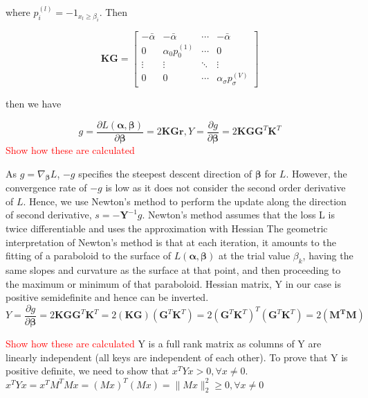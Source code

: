 where $p_i^{(l)}=-1_{x_l\geq \beta_i}$. Then

$$
\boldsymbol{KG}=\begin{bmatrix}
 -\bar{\alpha} & -\bar{\alpha} & \cdots & -\bar{\alpha} \\
 0 & \alpha_0p_0^{(1)} & \cdots  & 0 \\
 \vdots & \vdots & \ddots & \vdots \\
 0 & 0 & \cdots & \alpha_\sigma p_\sigma^{(V)}
\end{bmatrix}
$$

then we have 

\begin{equation}
	g=\frac{\partial L(\boldsymbol{\alpha},\boldsymbol{\beta})}{\partial \boldsymbol{\beta}}=2\boldsymbol{KGr},
	Y=\frac{\partial g}{\partial \boldsymbol{\beta}}=2\boldsymbol{KGG}^T \boldsymbol{K}^T
\end{equation}
\textcolor{red}{Show how these are calculated}

As $g=\nabla_{\boldsymbol{\beta}} L$, $-g$ specifies the steepest descent direction of $\boldsymbol{\beta}$ for $L$. However, the convergence rate of $-g$ is low as it does not consider the second order derivative of $L$. Hence, we use Newton's method to perform the update along the direction of second derivative, $s=-\boldsymbol{Y}^{-1}g$. Newton's method assumes that the loss L is twice differentiable and uses the approximation with Hessian
The geometric interpretation of Newton's method is that at each iteration, it amounts to the fitting of a paraboloid to the surface of $L(\boldsymbol{\alpha},\boldsymbol{\beta})$  at the trial value $\beta_{k}$, having the same slopes and curvature as the surface at that point, and then proceeding to the maximum or minimum of that paraboloid. 
Hessian matrix, Y in our case is positive semidefinite and hence can be inverted. 
\begin{equation}
	Y=\frac{\partial g}{\partial \boldsymbol{\beta}}=2\boldsymbol{KGG}^T \boldsymbol{K}^T= 2 \boldsymbol{(KG)} (\boldsymbol{G}^T \boldsymbol{K}^T)=2 (\boldsymbol{G}^T \boldsymbol{K}^T)^T (\boldsymbol{G}^T \boldsymbol{K}^T)= 2\boldsymbol{({M}^TM)}
\end{equation}

\textcolor{red}{Show how these are calculated}
Y is a full rank matrix as columns of Y are linearly independent (all keys are independent of each other). To prove that Y is positive definite, we need to show that ${x}^TYx > 0,  \forall x \neq 0$. \\ 
${x}^TYx = {x}^T{M}^TMx = {(Mx)}^T(Mx) = \| Mx\|_{2}^{2} \geq 0,\forall x \neq 0 $

